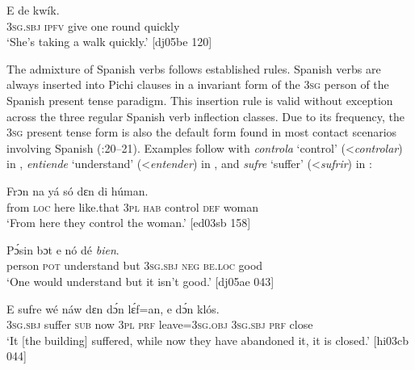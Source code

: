 \ea%
    \label{ex:key:1708}
    \gll E    de          kwík.\\
\textsc{3sg.sbj}  \textsc{ipfv}  give  one    round  quickly\\

\glt ‘She’s taking a walk quickly.’ [dj05be 120]
\z

The admixture of Spanish verbs follows established rules. Spanish verbs are always inserted into Pichi clauses in a invariant form of the \textsc{3sg} person of the Spanish present tense paradigm. This insertion rule is valid without exception across the three regular Spanish verb inflection classes. Due to its frequency, the \textsc{3sg} present tense form is also the default form found in most contact scenarios involving Spanish (\citealt{Clements2009}:20–21). Examples follow with \textit{controla} ‘control’ (<\textit{controlar}) in , \textit{entiende} ‘understand’ (<\textit{entender}) in , and \textit{sufre} ‘suffer’ (<\textit{sufrir}) in :


\ea%
    \label{ex:key:1709}
    \gll Frɔn    na  yá    só    dɛn      di  húman.\\
from  \textsc{loc}  here    like.that  \textsc{3pl}  \textsc{hab}  control  \textsc{def}  woman\\

\glt ‘From here they control the woman.’ [ed03sb 158]
\z


\ea%
    \label{ex:key:1710}
    \gll Pɔ́sin        bɔt  e    nó  dé    \textit{bien}.\\
person  \textsc{pot}  understand  but  \textsc{3sg.sbj}  \textsc{neg}  \textsc{be.loc}  good\\

\glt ‘One would understand but it isn’t good.’ [dj05ae 043]
\z


\ea%
    \label{ex:key:1711}
    \gll E    sufre  wé  náw  dɛn  dɔ́n  lɛ́f=an,    e    dɔ́n  klós.\\
\textsc{3sg.sbj}  suffer  \textsc{sub}  now  \textsc{3pl}  \textsc{prf}  leave=\textsc{3sg.obj}  \textsc{3sg.sbj}  \textsc{prf}  close\\

\glt ‘It [the building] suffered, while now they have abandoned it, it is closed.’ [hi03cb 044]
\z

